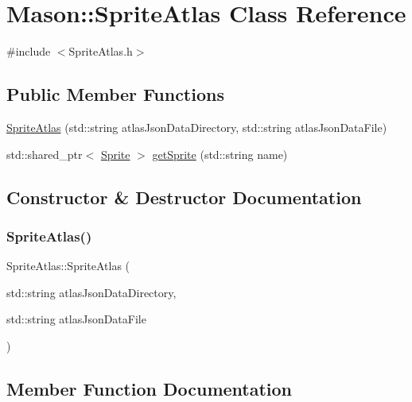 \hypertarget{class_mason_1_1_sprite_atlas}{}\section{Mason\+:\+:Sprite\+Atlas Class Reference}
\label{class_mason_1_1_sprite_atlas}


{\ttfamily \#include $<$Sprite\+Atlas.\+h$>$}

\subsection*{Public Member Functions}
\begin{DoxyCompactItemize}
\item 
\hyperlink{class_mason_1_1_sprite_atlas_a7740eb98380f42a0d5b787d44114be8f}{Sprite\+Atlas} (std\+::string atlas\+Json\+Data\+Directory, std\+::string atlas\+Json\+Data\+File)
\item 
std\+::shared\+\_\+ptr$<$ \hyperlink{class_mason_1_1_sprite}{Sprite} $>$ \hyperlink{class_mason_1_1_sprite_atlas_a05b230664b024ef23726bfa509da6a40}{get\+Sprite} (std\+::string name)
\end{DoxyCompactItemize}


\subsection{Constructor \& Destructor Documentation}
\hypertarget{class_mason_1_1_sprite_atlas_a7740eb98380f42a0d5b787d44114be8f}{}\label{class_mason_1_1_sprite_atlas_a7740eb98380f42a0d5b787d44114be8f} 
\subsubsection{\texorpdfstring{Sprite\+Atlas()}{SpriteAtlas()}}
{\footnotesize\ttfamily Sprite\+Atlas\+::\+Sprite\+Atlas (\begin{DoxyParamCaption}\item[{std\+::string}]{atlas\+Json\+Data\+Directory,  }\item[{std\+::string}]{atlas\+Json\+Data\+File }\end{DoxyParamCaption})}



\subsection{Member Function Documentation}
\hypertarget{class_mason_1_1_sprite_atlas_a05b230664b024ef23726bfa509da6a40}{}\label{class_mason_1_1_sprite_atlas_a05b230664b024ef23726bfa509da6a40} 
